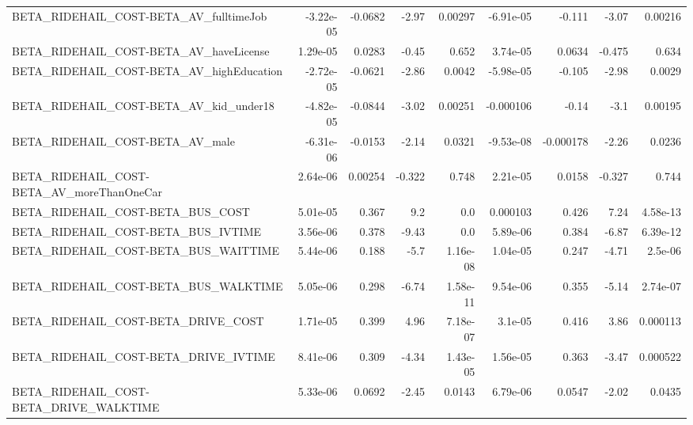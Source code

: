 \begin{tabular}{lrrrrrrrr}
BETA\_RIDEHAIL\_COST-BETA\_AV\_fulltimeJob             &   -3.22e-05 &      -0.0682 &    -2.97 &  0.00297 &  -6.91e-05 &      -0.111 &        -3.07 &       0.00216 \\
BETA\_RIDEHAIL\_COST-BETA\_AV\_haveLicense             &    1.29e-05 &       0.0283 &    -0.45 &    0.652 &   3.74e-05 &      0.0634 &       -0.475 &         0.634 \\
BETA\_RIDEHAIL\_COST-BETA\_AV\_highEducation           &   -2.72e-05 &      -0.0621 &    -2.86 &   0.0042 &  -5.98e-05 &      -0.105 &        -2.98 &        0.0029 \\
BETA\_RIDEHAIL\_COST-BETA\_AV\_kid\_under18             &   -4.82e-05 &      -0.0844 &    -3.02 &  0.00251 &  -0.000106 &       -0.14 &         -3.1 &       0.00195 \\
BETA\_RIDEHAIL\_COST-BETA\_AV\_male                    &   -6.31e-06 &      -0.0153 &    -2.14 &   0.0321 &  -9.53e-08 &   -0.000178 &        -2.26 &        0.0236 \\
BETA\_RIDEHAIL\_COST-BETA\_AV\_moreThanOneCar          &    2.64e-06 &      0.00254 &   -0.322 &    0.748 &   2.21e-05 &      0.0158 &       -0.327 &         0.744 \\
BETA\_RIDEHAIL\_COST-BETA\_BUS\_COST                   &    5.01e-05 &        0.367 &      9.2 &      0.0 &   0.000103 &       0.426 &         7.24 &      4.58e-13 \\
BETA\_RIDEHAIL\_COST-BETA\_BUS\_IVTIME                 &    3.56e-06 &        0.378 &    -9.43 &      0.0 &   5.89e-06 &       0.384 &        -6.87 &      6.39e-12 \\
BETA\_RIDEHAIL\_COST-BETA\_BUS\_WAITTIME               &    5.44e-06 &        0.188 &     -5.7 & 1.16e-08 &   1.04e-05 &       0.247 &        -4.71 &       2.5e-06 \\
BETA\_RIDEHAIL\_COST-BETA\_BUS\_WALKTIME               &    5.05e-06 &        0.298 &    -6.74 & 1.58e-11 &   9.54e-06 &       0.355 &        -5.14 &      2.74e-07 \\
BETA\_RIDEHAIL\_COST-BETA\_DRIVE\_COST                 &    1.71e-05 &        0.399 &     4.96 & 7.18e-07 &    3.1e-05 &       0.416 &         3.86 &      0.000113 \\
BETA\_RIDEHAIL\_COST-BETA\_DRIVE\_IVTIME               &    8.41e-06 &        0.309 &    -4.34 & 1.43e-05 &   1.56e-05 &       0.363 &        -3.47 &      0.000522 \\
BETA\_RIDEHAIL\_COST-BETA\_DRIVE\_WALKTIME             &    5.33e-06 &       0.0692 &    -2.45 &   0.0143 &   6.79e-06 &      0.0547 &        -2.02 &        0.0435 \\

\end{tabular}
